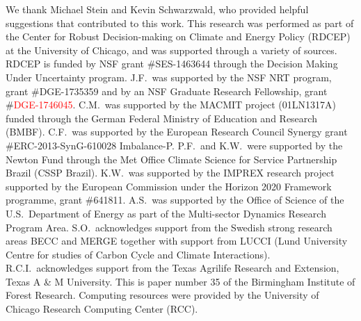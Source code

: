 \documentclass[gmd, manuscript]{copernicus} %
\begin{document}
\begin{acknowledgements}
We thank Michael Stein and Kevin Schwarzwald, who provided helpful suggestions that contributed to this work. 
This research was performed as part of the Center for Robust Decision-making on Climate and Energy Policy (RDCEP) at the University of Chicago, and was supported through a variety of sources. 
RDCEP is funded by NSF grant \#SES-1463644 through the Decision Making Under Uncertainty program. 
	J.F.\ was supported by the NSF NRT program, grant \#DGE-1735359 and by an NSF Graduate Research Fellowship, grant \#\textcolor{red}{DGE-1746045}. 
C.M.\ was supported by the MACMIT project (01LN1317A) funded through the German Federal Ministry of Education and Research (BMBF). 
C.F.\ was supported by the European Research Council Synergy grant \#ERC-2013-SynG-610028 Imbalance-P. 
P.F.\ and K.W.\ were supported  by the Newton Fund through the Met Office Climate Science for Service Partnership Brazil (CSSP Brazil). 
K.W.\ was supported by the IMPREX research project supported by the European Commission under the Horizon 2020 Framework programme, grant \#641811. 
A.S.\ was supported by the Office of Science of the U.S.\ Department of Energy as part of the Multi-sector Dynamics Research Program Area. 
S.O.\ acknowledges support from the Swedish strong research areas BECC and MERGE together with support from LUCCI (Lund University Centre for studies of Carbon Cycle and Climate Interactions). 
R.C.I.\ acknowledges support from the Texas Agrilife Research and Extension, Texas A \& M University. 
This is paper number 35 of the Birmingham Institute of Forest Research. 
Computing resources were provided by the University of Chicago Research Computing Center (RCC).
\end{acknowledgements}



\end{document}
